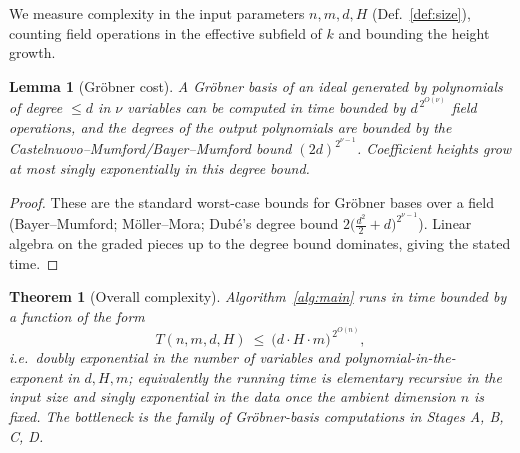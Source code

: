 \documentclass{amsart}
\theoremstyle{plain}
\newtheorem{theorem}{Theorem}
\newtheorem{lemma}{Lemma}
\theoremstyle{definition}
\begin{document}
We measure complexity in the input parameters $n,m,d,H$ (Def.~\ref{def:size}),
counting field operations in the effective subfield of $k$ and bounding the
height growth.

\begin{lemma}[Gr\"obner cost]\label{lem:groebner}
A Gr\"obner basis of an ideal generated by polynomials of degree $\le d$ in $\nu$
variables can be computed in time bounded by $d^{\,2^{O(\nu)}}$ field operations,
and the degrees of the output polynomials are bounded by the
Castelnuovo--Mumford/Bayer--Mumford bound $(2d)^{2^{\nu-1}}$.  Coefficient
heights grow at most singly exponentially in this degree bound.
\end{lemma}

\begin{proof}
These are the standard worst-case bounds for Gr\"obner bases over a field
(Bayer--Mumford; M\"oller--Mora; Dub\'e's degree bound
$2\big(\tfrac{d^2}{2}+d\big)^{2^{\nu-1}}$).  Linear algebra on the graded pieces
up to the degree bound dominates, giving the stated time.
\end{proof}

\begin{theorem}[Overall complexity]\label{thm:complexity}
Algorithm~\ref{alg:main} runs in time bounded by a function of the form
\[
T(n,m,d,H)\ \le\ \big(d\cdot H\cdot m\big)^{\,2^{O(n)}},
\]
i.e.\ doubly exponential in the number of variables and polynomial-in-the-
exponent in $d,H,m$; equivalently the running time is \emph{elementary recursive}
in the input size and singly exponential in the data once the ambient dimension
$n$ is fixed.  The bottleneck is the family of Gr\"obner-basis computations in
Stages A, B, C, D.
\end{theorem}
\end{document}
